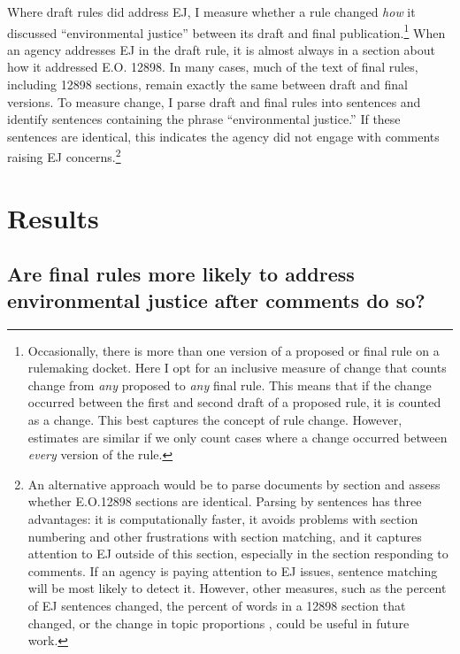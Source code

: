\documentclass[
      12pt,
        ]{article}
\begin{document}
Where draft rules did address EJ, I measure whether a rule changed \emph{how} it discussed ``environmental justice'' between its draft and final publication.\footnote{Occasionally, there is more than one version of a proposed or final rule on a rulemaking docket. Here I opt for an inclusive measure of change that counts change from \emph{any} proposed to \emph{any} final rule. This means that if the change occurred between the first and second draft of a proposed rule, it is counted as a change. This best captures the concept of rule change. However, estimates are similar if we only count cases where a change occurred between \emph{every} version of the rule.}
When an agency addresses EJ in the draft rule, it is almost always in a section about how it addressed E.O. 12898. In many cases, much of the text of final rules, including 12898 sections, remain exactly the same between draft and final versions.
To measure change, I parse draft and final rules into sentences and identify sentences containing the phrase ``environmental justice.'' If these sentences are identical, this indicates the agency did not engage with comments raising EJ concerns.\footnote{An alternative approach would be to parse documents by section and assess whether E.O.12898 sections are identical. Parsing by sentences has three advantages: it is computationally faster, it avoids problems with section numbering and other frustrations with section matching, and it captures attention to EJ outside of this section, especially in the section responding to comments. If an agency is paying attention to EJ issues, sentence matching will be most likely to detect it. However, other measures, such as the percent of EJ sentences changed, the percent of words in a 12898 section that changed, or the change in topic proportions \citep{Judge-Lord2017}, could be useful in future work.}

\hypertarget{results}{%
\section{Results}\label{results}}

\hypertarget{are-final-rules-more-likely-to-address-environmental-justice-after-comments-do-so}{%
\subsection{Are final rules more likely to address environmental justice after comments do so?}\label{are-final-rules-more-likely-to-address-environmental-justice-after-comments-do-so}}
\end{document}
